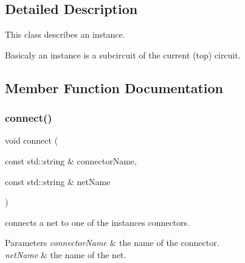 \subsection{Detailed Description}
This class describes an instance.

Basicaly an instance is a subcircuit of the current (top) circuit. 

\subsection{Member Function Documentation}
\mbox{\label{class_open_chams_1_1_instance_a96b4f4ce732290340f727169d2e43ee8}} 
\subsubsection{\texorpdfstring{connect()}{connect()}}
{\footnotesize\ttfamily void connect (\begin{DoxyParamCaption}\item[{const std\+::string \&}]{connector\+Name,  }\item[{const std\+::string \&}]{net\+Name }\end{DoxyParamCaption})}



connects a net to one of the instance\textquotesingle{}s connectors. 


\begin{DoxyParams}{Parameters}
{\em connector\+Name} & the name of the connector. \\
\hline
{\em net\+Name} & the name of the net. \\
\hline
\end{DoxyParams}
